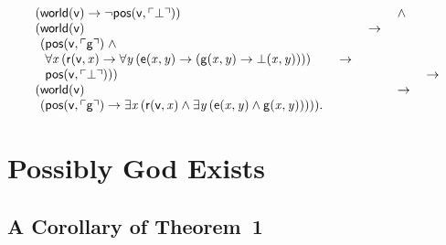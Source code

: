 \documentclass[a4paper]{article}
\newcommand{\imp}{\rightarrow}
\newcommand{\quoted}[1]{\ulcorner #1\urcorner}
\begin{document}
\[\begin{array}{lllll}
(\mathsf{world}(\mathsf{v}) \imp  \lnot  \mathsf{pos}(\mathsf{v},\mathsf{\quoted{\bot}})) &&&\; \land \\
(\mathsf{world}(\mathsf{v}) &&\; \imp \\
\hphantom{(} (\mathsf{pos}(\mathsf{v},\mathsf{\quoted{g}}) \; \land \\
\hphantom{((} \forall \mathit{x} \, (\mathsf{r}(\mathsf{v},\mathit{x}) \imp  \forall \mathit{y} \, (\mathsf{e}(\mathit{x},\mathit{y}) \imp  (\mathsf{g}(\mathit{x},\mathit{y}) \imp  \mathsf{\bot}(\mathit{x},\mathit{y})))) &\; \imp \\
\hphantom{((} \mathsf{pos}(\mathsf{v},\mathsf{\quoted{\bot}}))) &&&&\; \imp \\
(\mathsf{world}(\mathsf{v}) &&&\; \imp \\
\hphantom{(} (\mathsf{pos}(\mathsf{v},\mathsf{\quoted{g}}) \imp  \exists \mathit{x} \, (\mathsf{r}(\mathsf{v},\mathit{x}) \land  \exists \mathit{y} \, (\mathsf{e}(\mathit{x},\mathit{y}) \land  \mathsf{g}(\mathit{x},\mathit{y}))))).
\end{array}
\]
%
%

  \section{Possibly God Exists}

  \subsection{A Corollary of Theorem~1}
  
\end{document}
